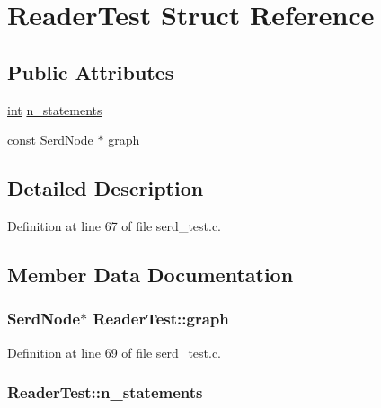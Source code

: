 \hypertarget{struct_reader_test}{}\section{Reader\+Test Struct Reference}
\label{struct_reader_test}
\subsection*{Public Attributes}
\begin{DoxyCompactItemize}
\item 
\hyperlink{xmltok_8h_a5a0d4a5641ce434f1d23533f2b2e6653}{int} \hyperlink{struct_reader_test_a829e49c31a191c7ff6b010c092dd1876}{n\+\_\+statements}
\item 
\hyperlink{getopt1_8c_a2c212835823e3c54a8ab6d95c652660e}{const} \hyperlink{struct_serd_node}{Serd\+Node} $\ast$ \hyperlink{struct_reader_test_add73219f5ba9305f14e242d63929c720}{graph}
\end{DoxyCompactItemize}


\subsection{Detailed Description}


Definition at line 67 of file serd\+\_\+test.\+c.



\subsection{Member Data Documentation}
\subsubsection[{\texorpdfstring{graph}{graph}}]{ {\bf Serd\+Node}$\ast$ Reader\+Test\+::graph}\hypertarget{struct_reader_test_add73219f5ba9305f14e242d63929c720}{}\label{struct_reader_test_add73219f5ba9305f14e242d63929c720}


Definition at line 69 of file serd\+\_\+test.\+c.

\subsubsection[{\texorpdfstring{n\+\_\+statements}{n_statements}}]{ Reader\+Test\+::n\+\_\+statements}\hypertarget{struct_reader_test_a829e49c31a191c7ff6b010c092dd1876}{}\label{struct_reader_test_a829e49c31a191c7ff6b010c092dd1876}


